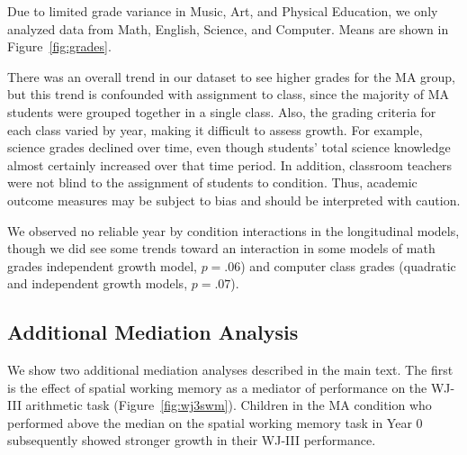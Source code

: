 \documentclass[11pt]{article}
\begin{document}
Due to limited grade variance in Music, Art, and Physical Education, we only analyzed data from Math, English, Science, and Computer. Means are shown in Figure~\ref{fig:grades}. 

There was an overall trend in our dataset to see higher grades for the MA group, but this trend is confounded with assignment to class, since the majority of MA students were grouped together in a single class. Also, the grading criteria for each class varied by year, making it difficult to assess growth. For example, science grades declined over time, even though students' total science knowledge almost certainly increased over that time period. In addition, classroom teachers were not blind to the assignment of students to condition. Thus, academic outcome measures may be subject to bias and should be interpreted with caution. 

We observed no reliable year by condition interactions in the longitudinal models, though we did see some trends toward an interaction in some models of math grades independent growth model, $p = .06$) and computer class grades (quadratic and independent growth models, $p = .07$). 
 



\subsection{Additional Mediation Analysis}

We show two additional mediation analyses described in the main text. The first is the effect of spatial working memory as a mediator of performance on the WJ-III arithmetic task (Figure~\ref{fig:wj3swm}). Children in the MA condition who performed above the median on the spatial working memory task in Year 0 subsequently showed stronger growth in their WJ-III performance. 
\end{document}
